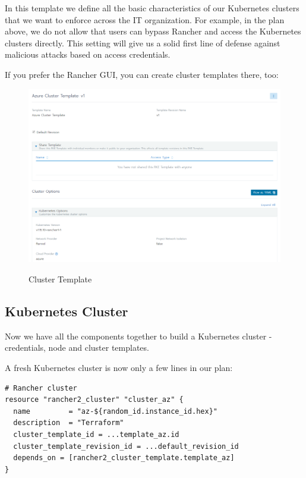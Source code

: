 In this template we define all the basic characteristics of our Kubernetes clusters that we want to enforce across the IT organization. For example, in the plan above, we do not allow that users can bypass Rancher and access the Kubernetes clusters directly. This setting will give us a solid first line of defense against malicious attacks based on access credentials.

If you prefer the Rancher GUI, you can create cluster templates there, too:

\begin{figure}[H]
\centering
\caption {Cluster Template}
\includegraphics[width=\linewidth]{images/cluster-template.png}
\label{fig:clusterTemplate}
\end{figure}

\subsection{Kubernetes Cluster}

Now we have all the components together to build a Kubernetes cluster - credentials, node and cluster templates. 

A fresh Kubernetes cluster is now only a few lines in our plan:

\begin{lstlisting}[caption=Kubernetes Cluster, frame=single, basicstyle=\ttfamily]
# Rancher cluster
resource "rancher2_cluster" "cluster_az" {
  name         = "az-${random_id.instance_id.hex}"
  description  = "Terraform"
  cluster_template_id = ...template_az.id
  cluster_template_revision_id = ...default_revision_id
  depends_on = [rancher2_cluster_template.template_az]
}
\end{lstlisting}

